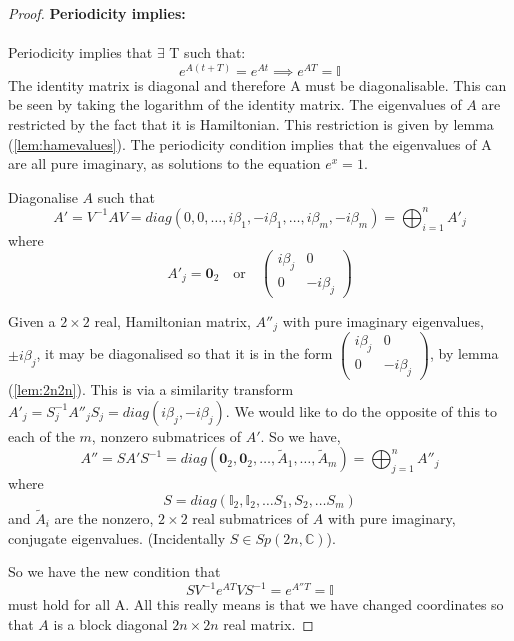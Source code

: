 \begin{proof}
\textbf{Periodicity implies:} \\\\
Periodicity implies that $\exists$ T such that:
\begin{equation}
e^{A(t+T)}=e^{At} \implies e^{AT}=\mathbb{I}
\end{equation}
The identity matrix is diagonal and therefore A must be diagonalisable. This can be seen by taking the logarithm of the identity matrix. The eigenvalues of $A$ are restricted by the fact that it is Hamiltonian. This restriction is given by lemma (\ref{lem:hamevalues}). The periodicity condition implies that the eigenvalues of A are all pure imaginary, as solutions to the equation $e^x=1$.

Diagonalise $A$ such that
\begin{equation}
A' = V^{-1}AV= diag(0,0,\ldots,i\beta_1,-i\beta_1,\ldots,i\beta_m,-i\beta_m) = \bigoplus_{i=1}^n A'_j
\end{equation}
where
\begin{equation}
A'_j = \mathbf{0}_2 \quad \text{or} \quad \begin{pmatrix} i\beta_j & 0 \\ 0 & -i\beta_j \end{pmatrix}
\end{equation} 

Given a $2 \times 2$ real, Hamiltonian matrix, $A''_j$ with pure imaginary eigenvalues, $\pm i \beta_j$, it may be diagonalised so that it is in the form $\begin{pmatrix}  i\beta_j & 0 \\ 0 & -i\beta_j \end{pmatrix}$, by lemma (\ref{lem:2n2n}). This is via a similarity transform $A'_j = S^{-1}_jA''_jS_j=diag(i\beta_j,-i\beta_j)$. We would like to do the opposite of this to each of the $m$, nonzero submatrices of $A'$. So we have,
\begin{equation}
A'' = SA'S^{-1} = diag(\mathbf{0}_2,\mathbf{0}_2,\ldots,\tilde{A}_1, \ldots, \tilde{A}_m) = \bigoplus_{j=1}^n A''_j
\end{equation}
where
\begin{equation}
S = diag(\mathbb{I}_2,\mathbb{I}_2,\ldots S_1,S_2,\ldots S_m) 
\end{equation}
and
$\tilde{A}_i$ are the nonzero, $2 \times 2$ real submatrices of $A$ with pure imaginary, conjugate eigenvalues. (Incidentally $S \in Sp(2n,\mathbb{C})$).

So we have the new condition that
\begin{equation}
SV^{-1}e^{AT}VS^{-1} = e^{A''T} = \mathbb{I}
\end{equation}
must hold for all A. All this really means is that we have changed coordinates so that $A$ is a block diagonal $2n \times 2n$ real matrix. 


\end{proof}
